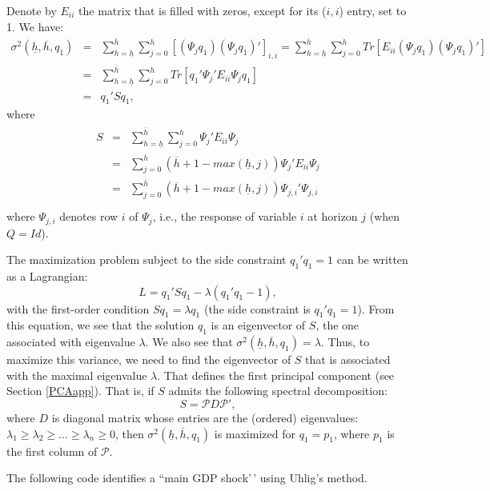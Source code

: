 \documentclass[
  11pt,
]{book}
\theoremstyle{definition}
\theoremstyle{definition}
\theoremstyle{definition}
\theoremstyle{definition}
\theoremstyle{remark}
\begin{document}
Denote by \(E_{ii}\) the matrix that is filled with zeros, except for its (\(i,i\)) entry, set to 1. We have:
\begin{eqnarray*}
\sigma^2(\underline{h},\overline{h},q_1)&=&\sum_{h=\underline{h}}^{\overline{h}} \sum_{j=0}^h\left[(\Psi_jq_1)(\Psi_jq_1)'\right]_{i,i}=\sum_{h=\underline{h}}^{\overline{h}} \sum_{j=0}^h Tr\left[E_{ii}(\Psi_jq_1)(\Psi_jq_1)'\right]\\
&=&\sum_{h=\underline{h}}^{\overline{h}} \sum_{j=0}^h Tr\left[q_1'\Psi_j'E_{ii}\Psi_j q_1\right]\\
&=& q_1'Sq_1,
\end{eqnarray*}
where
\begin{eqnarray*}
\begin{array}{lll}S&=&\sum_{h=\underline{h}}^{\overline{h}}\sum_{j=0}^{h}\Psi_j'E_{ii}\Psi_j\\
&=&\sum_{j=0}^{\overline{h}}(\overline{h}+1-max(\underline{h},j))\Psi_j'E_{ii}\Psi_j\\
&=&\sum_{j=0}^{\overline{h}}(\overline{h}+1-max(\underline{h},j))\Psi_{j,i}'\Psi_{j,i}\\
\end{array}
\end{eqnarray*}
where \(\Psi_{j,i}\) denotes row \(i\) of \(\Psi_{j}\), i.e., the response of variable \(i\) at horizon \(j\) (when \(Q=Id\)).

The maximization problem subject to the side constraint \(q_1'q_1=1\) can be written as a Lagrangian: \[
L=q_1'Sq_1-\lambda(q_1'q_1-1),
\]
with the first-order condition \(Sq_1=\lambda q_1\) (the side constraint is \(q_1'q_1=1\)). From this equation, we see that the solution \(q_1\) is an eigenvector of \(S\), the one associated with eigenvalue \(\lambda\). We also see that \(\sigma^2(\underline{h},\overline{h},q_1)=\lambda\). Thus, to maximize this variance, we need to find the eigenvector of \(S\) that is associated with the maximal eigenvalue \(\lambda\). That defines the first principal component (see Section \ref{PCAapp}). That is, if \(S\) admits the following spectral decomposition:
\[
S = \mathcal{P}D\mathcal{P}',
\]
where \(D\) is diagonal matrix whose entries are the (ordered) eigenvalues: \(\lambda_1 \ge \lambda_2 \ge \dots \ge \lambda_n \ge 0\), then \(\sigma^2(\underline{h},\overline{h},q_1)\) is maximized for \(q_1 = p_1\), where \(p_1\) is the first column of \(\mathcal{P}\).

The following code identifies a ``main GDP shock'\,' using Uhlig's method.
\end{document}
